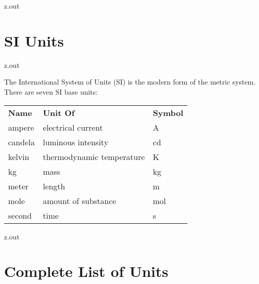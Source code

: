 \MyIO


\begin{VerbatimOut}{z.out}

\section{SI Units}
\end{VerbatimOut}

\MyIO


\begin{VerbatimOut}{z.out}

The International System of Units
(SI)
is the modern form of the metric system.
There are seven SI base units:

\hspace{40pt}
\begin{tabular}{@{}lll@{}}
  \tabularspace
  \bfseries Name& \bfseries Unit Of&         \bfseries Symbol\\
  \tabularspace
  ampere&         electrical current&        \si{\ampere}\\
  candela&        luminous intensity&        \si{\candela}\\
  kelvin&         thermodynamic temperature& \si{\kelvin}\\
  kg&             mass&                      \si{\kilogram}\\
  meter&          length&                    \si{\meter}\\
  mole&           amount of substance&       \si{\mole}\\
  second&         time&                      \si{\second}\\
\end{tabular}
\end{VerbatimOut}

\MyIO


\begin{VerbatimOut}{z.out}

\section{Complete List of Units}
\label{se:Complete-List-of-Units}
\end{VerbatimOut}

